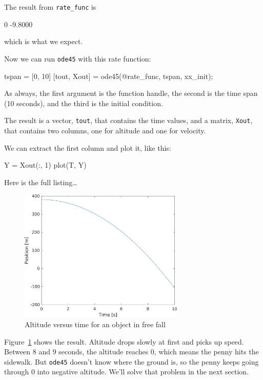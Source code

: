 
The result from \lstinline{rate_func} is

\begin{code}
    0
   -9.8000
\end{code}
which is what we expect.

Now we can run \lstinline{ode45} with this rate function:

\begin{code}
tspan = [0, 10]
[tout, Xout] = ode45(@rate_func, tspan, xx_init);
\end{code}

As always, the first argument is the function handle, the second is the time span (10 seconds), and the third is the initial condition.

The result is a vector, \lstinline{tout}, that contains the time values, and a matrix, \lstinline{Xout}, that contains two columns, one for altitude and one for velocity.

We can extract the first column and plot it, like this:

\begin{code}
Y = Xout(:, 1)
plot(T, Y)
\end{code}

Here is the full listing\dots


\begin{figure}
\centerline{\includegraphics[width=0.7\textwidth]{../code/chap11/penny1.png}}
\caption{Altitude versus time for an object in free fall}
\label{fig:penny}
\end{figure}

Figure~\ref{fig:penny} shows the result.  Altitude drops slowly at first and picks up speed.  Between 8 and 9 seconds, the altitude reaches 0, which means the penny hits the sidewalk.  But \lstinline{ode45} doesn't know where the ground is, so  the penny keeps going through 0 into negative altitude.  We'll solve that problem in the next section.


